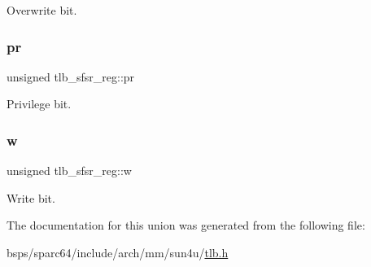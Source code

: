 Overwrite bit. \mbox{\label{uniontlb__sfsr__reg_aa0d1ed8c97e41378ebe60a9a3f5ee731}} 
\subsubsection{\texorpdfstring{pr}{pr}}
{\footnotesize\ttfamily unsigned tlb\+\_\+sfsr\+\_\+reg\+::pr}

Privilege bit. \mbox{\label{uniontlb__sfsr__reg_a20156a31b35acc5f0a95f0dca068642b}} 
\subsubsection{\texorpdfstring{w}{w}}
{\footnotesize\ttfamily unsigned tlb\+\_\+sfsr\+\_\+reg\+::w}

Write bit. 

The documentation for this union was generated from the following file\+:\begin{DoxyCompactItemize}
\item 
bsps/sparc64/include/arch/mm/sun4u/\mbox{\hyperlink{sun4u_2tlb_8h}{tlb.\+h}}\end{DoxyCompactItemize}
